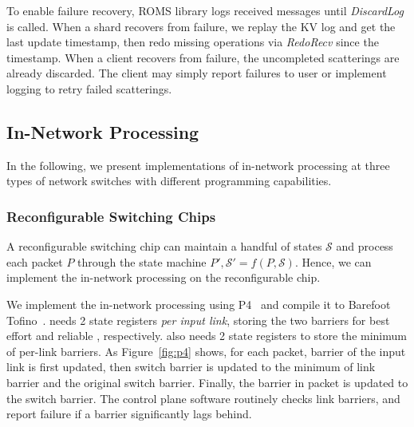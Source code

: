 To enable failure recovery, ROMS library logs received messages until \emph{DiscardLog} is called.
When a shard recovers from failure, we replay the KV log and get the last update timestamp, then redo missing operations via \emph{RedoRecv} since the timestamp.
When a client recovers from failure, the uncompleted scatterings are already discarded.
The client may simply report failures to user or implement logging to retry failed scatterings.
\fi


\subsection{In-Network Processing}
\label{sec:in-network-processing}

In the following, we present implementations of in-network processing at three types of network switches with different programming capabilities.


\subsubsection{Reconfigurable Switching Chips}
\label{sec:p4}
A reconfigurable switching chip can maintain 
a handful of states $\mathcal{S}$ and process each packet $P$ through the state machine $P', \mathcal{S}' = f(P, \mathcal{S})$. Hence, we can implement the in-network processing on the reconfigurable chip. 

We implement the in-network processing using P4~\cite{bosshart2014p4} and compile it to Barefoot Tofino~\cite{tofino}. \sys{} needs 2 state registers \emph{per input link}, storing the two barriers for best effort and reliable \sys{}, respectively. \sys{} also needs 2 state registers to store the minimum of per-link barriers. As Figure~\ref{fig:p4} shows, for each packet, barrier of the input link is first updated, then switch barrier is updated to the minimum of link barrier and the original switch barrier. Finally, the barrier in packet is updated to the switch barrier. The control plane software routinely checks link barriers, and report failure if a barrier significantly lags behind.



